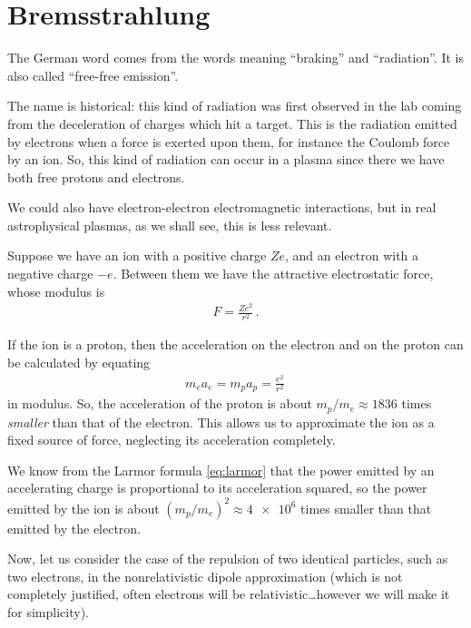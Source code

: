 \documentclass[main.tex]{subfiles}
\begin{document}
\section{Bremsstrahlung}


The German word comes from the words meaning ``braking'' and ``radiation''. It is also called ``free-free emission''. 

The name is historical: this kind of radiation was first observed in the lab coming from the deceleration of charges which hit a target. 
This is the radiation emitted by electrons when a force is exerted upon them, for instance the Coulomb force by an ion. So, this kind of radiation can occur in a plasma since there we have both free protons and electrons. 

We could also have electron-electron electromagnetic interactions, but in real astrophysical plasmas, as we shall see, this is less relevant. 

Suppose we have an ion with a positive charge \(Ze\), and an electron with a negative charge \(-e\). Between them we have the attractive electrostatic force, whose modulus is 
%
\begin{align}
F = \frac{Z e^2}{r^2}
\,.
\end{align}

If the ion is a proton, then the acceleration on the electron and on the proton can be calculated by equating 
%
\begin{align}
m_e a_e = m_p a_p = \frac{e^2}{r^2} 
\,
\end{align}
%
in modulus.
So, the acceleration of the proton is about \(m_p / m_e \approx 1836\) times \emph{smaller} than that of the electron. This allows us to approximate the ion as a fixed source of force, neglecting its acceleration completely.  

We know from the Larmor formula \eqref{eq:larmor} that the power emitted by an accelerating charge is proportional to its acceleration squared, so the power emitted by the ion is about \((m_p / m_e)^2 \approx \num{4e6}\) times smaller than that emitted by the electron. 

Now, let us consider the case of the repulsion of two identical particles, such as two electrons, in the nonrelativistic dipole approximation (which is not completely justified, often electrons will be relativistic\dots however we will make it for simplicity).
\end{document}
